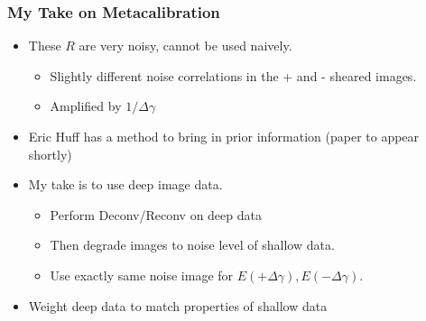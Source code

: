 \documentclass{beamer}
\begin{document}
\frame
{
    \frametitle{My Take on Metacalibration}

 
    \begin{itemize}

        \item These $R$ are very noisy, cannot be used naively.
            \begin{itemize}

                \item Slightly different noise correlations in the + and -
                    sheared images.
                \item Amplified by $1/\Delta \gamma$
            \end{itemize}

        \item Eric Huff has a method to bring in prior information (paper
            to appear shortly)

        \item My take is to use deep image data.
            \begin{itemize}
                \item Perform Deconv/Reconv on deep data
                \item Then degrade images to noise level of shallow data.
                \item Use exactly same noise image for 
                    $E(+\Delta\gamma), E(-\Delta\gamma)$.
            \end{itemize}

        \item Weight deep data to match properties of shallow data

    \end{itemize}

}
\end{document}
